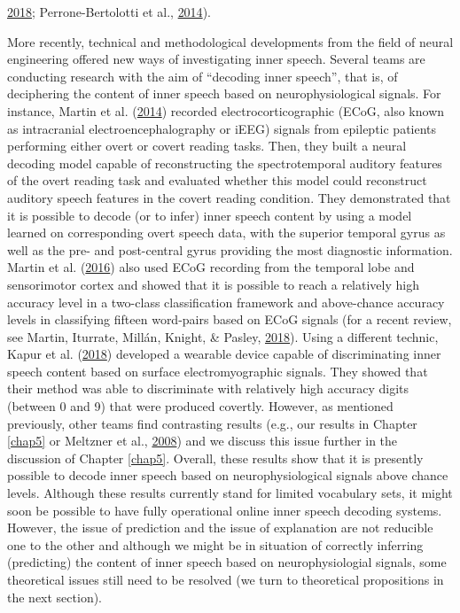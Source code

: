 \documentclass[a4paper,12pt,twoside,openright,oldfontcommands]{memoir}
\begin{document}
\protect\hyperlink{ref-loevenbruck_cognitive_2018}{2018}; Perrone-Bertolotti et al., \protect\hyperlink{ref-Perrone-Bertolotti2014}{2014}).

More recently, technical and methodological developments from the field of neural engineering offered new ways of investigating inner speech. Several teams are conducting research with the aim of \enquote{decoding inner speech}, that is, of deciphering the content of inner speech based on neurophysiological signals. For instance, Martin et al. (\protect\hyperlink{ref-martin_decoding_2014}{2014}) recorded electrocorticographic (ECoG, also known as intracranial electroencephalography or iEEG) signals from epileptic patients performing either overt or covert reading tasks. Then, they built a neural decoding model capable of reconstructing the spectrotemporal auditory features of the overt reading task and evaluated whether this model could reconstruct auditory speech features in the covert reading condition. They demonstrated that it is possible to decode (or to infer) inner speech content by using a model learned on corresponding overt speech data, with the superior temporal gyrus as well as the pre- and post-central gyrus providing the most diagnostic information. Martin et al. (\protect\hyperlink{ref-martin_word_2016}{2016}) also used ECoG recording from the temporal lobe and sensorimotor cortex and showed that it is possible to reach a relatively high accuracy level in a two-class classification framework and above-chance accuracy levels in classifying fifteen word-pairs based on ECoG signals (for a recent review, see Martin, Iturrate, Millán, Knight, \& Pasley, \protect\hyperlink{ref-martin_decoding_2018}{2018}). Using a different technic, Kapur et al. (\protect\hyperlink{ref-kapur_alterego_2018}{2018}) developed a wearable device capable of discriminating inner speech content based on surface electromyographic signals. They showed that their method was able to discriminate with relatively high accuracy digits (between 0 and 9) that were produced covertly. However, as mentioned previously, other teams find contrasting results (e.g., our results in Chapter \ref{chap5} or Meltzner et al., \protect\hyperlink{ref-meltzner_speech_2008}{2008}) and we discuss this issue further in the discussion of Chapter \ref{chap5}. Overall, these results show that it is presently possible to decode inner speech based on neurophysiological signals above chance levels. Although these results currently stand for limited vocabulary sets, it might soon be possible to have fully operational online inner speech decoding systems. However, the issue of prediction and the issue of explanation are not reducible one to the other and although we might be in situation of correctly inferring (predicting) the content of inner speech based on neurophysiologial signals, some theoretical issues still need to be resolved (we turn to theoretical propositions in the next section).
\end{document}
